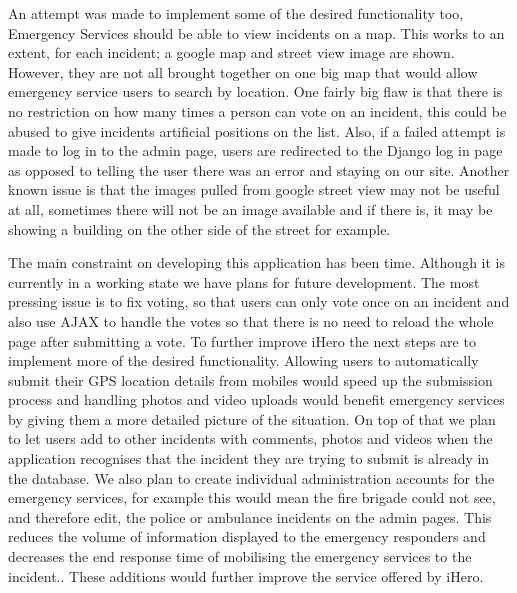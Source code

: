 \documentclass{sig-alt-release2}
\begin{document}
An attempt was made to implement some of the desired functionality too,  Emergency Services should be able to view incidents on a map. This works to an extent, for each incident; a google map and street view image are shown. However, they are not all brought together on one big map that would allow emergency service users to search by location. One fairly big flaw is that there is no restriction on how many times a person can vote on an incident, this could be abused to give incidents artificial positions on the list. Also, if a failed attempt is made to log in to the admin page, users are redirected to the Django log in page as opposed to telling the user there was an error and staying on our site. Another known issue is that the images pulled from google street view may not be useful at all, sometimes there will not be an image available and if there is, it may be showing a building on the other side of the street for example.

The main constraint on developing this application has been time. Although it is currently in a working state we have plans for future development. The most pressing issue is to fix voting, so that users can only vote once on an incident and also use AJAX to handle the votes so that there is no need to reload the whole page after submitting a vote. To further improve iHero the next steps are to implement more of the desired functionality. Allowing users to automatically submit their GPS location details from mobiles would speed up the submission process and handling photos and video uploads would benefit emergency services by giving them a more detailed picture of the situation. On top of that we plan to let users add to other incidents with comments, photos and videos when the application recognises that the incident they are trying to submit is already in the database. We also plan to create individual administration accounts for the emergency services, for example this would mean the fire brigade could not see, and therefore edit, the police or ambulance incidents on the admin pages. This reduces the volume of information displayed to the emergency responders and decreases the end response time of mobilising the emergency services to the incident.. These additions would further improve the service offered by iHero.

\newpage
\end{document}
